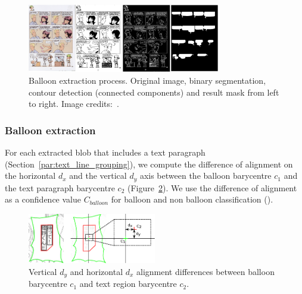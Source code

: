 	\begin{figure}[h!]	%
	  \centering
		\includegraphics[trim= 0px 0px 0px 0px, clip, width=0.75\textwidth]{closed_balloon_process.png}
		\caption[Sequential balloon extraction process illustration]{Balloon extraction process. Original image, binary segmentation, contour detection (connected components) and result mask from left to right. Image credits:~\cite{Midam01}. }
		\label{fig:se:closed_balloon}
	\end{figure}




\subsubsection{Balloon extraction} %
\label{par:balloon_extraction}

For each extracted blob that includes a text paragraph (Section~\ref{par:text_line_grouping}), we compute the difference of alignment on the horizontal $d_x$ and the vertical $d_y$ axis between the balloon barycentre $c_1$ and the text paragraph barycentre $c_2$ (Figure~\ref{fig:se:align_diff}).
We use the difference of alignment as a confidence value $C_{balloon}$ for balloon and non balloon classification ().

	\begin{figure}[h!]	%
	  \centering
		\includegraphics[trim= 140px 0px 0px 0px, clip, width=0.5\textwidth]{text_balloon_alignment.pdf}
		\caption[Illustration of the vertical and horizontal alignment differences between balloon and text region barycentre]{Vertical $d_y$ and horizontal $d_x$ alignment differences between balloon barycentre $c_1$ and text region barycentre $c_2$.}
		\label{fig:se:align_diff}
	\end{figure}

